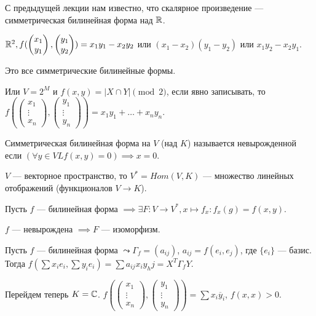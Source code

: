 С предыдущей лекции нам известно, что скалярное произведение --- симметрическая билинейная форма над  $\mathbb{R}$.
\begin{example}
    $\mathbb{R}^2, f(\begin{pmatrix} x_1 \\ y_1 \end{pmatrix}, \begin{pmatrix} y_1 \\ y_2 \end{pmatrix}) =x_1y_1 - x_2y_2$ или $(x_1-x_2)(y_1-y_2)$ или $x_1y_2 - x_2y_1$.

    Это все симметрические билинейные формы. 

    Или $V=2^M$ и  $f(x,y) = | X \cap Y| \pmod 2$, если явно записывать, то  $f(\begin{pmatrix} x_1 \\ \vdots \\ x_n \end{pmatrix}, \begin{pmatrix} y_1 \\ \vdots \\ y_n \end{pmatrix}) = x_1y_1 + \ldots + x_ny_n$.
\end{example}
\begin{definition}
    Симметрическая билинейная форма на $V$ (над $K$) называется невырожденной если $(\forall y \in V\!L f(x, y) = 0) \implies x = 0$.
\end{definition}
\begin{definition}
    $V$ --- векторное пространство, то  $V^* = Hom(V, K)$ --- множество линейных отображений (функционалов $V \to K$).
\end{definition}

Пусть $f$ --- билинейная форма  $\implies \exists F\!: V \to V^*, x \mapsto f_x\!: f_x(g) = f(x, y)$.

$f$ --- невырождена $\implies F$ --- изоморфизм. 

Пусть $f$ --- билинейная форма  $\leadsto \Gamma_f = (a_{ij})$,  $a_{ij} = f(e_i, e_j)$, где  $\{e_i\}$ --- базис. Тогда  $f(\sum x_i e_i, \sum y_i e_i) = \sum a_{ij} x_i y_hj = X^T \Gamma_f Y$.

Перейдем теперь  $K = \mathbb{C}$.  $f(\begin{pmatrix} x_1 \\ \vdots \\ x_n \end{pmatrix}, \begin{pmatrix} y_1 \\ \vdots \\ y_n \end{pmatrix}) = \sum x_i \overline{y}_i$, $f(x, x) > 0$.

